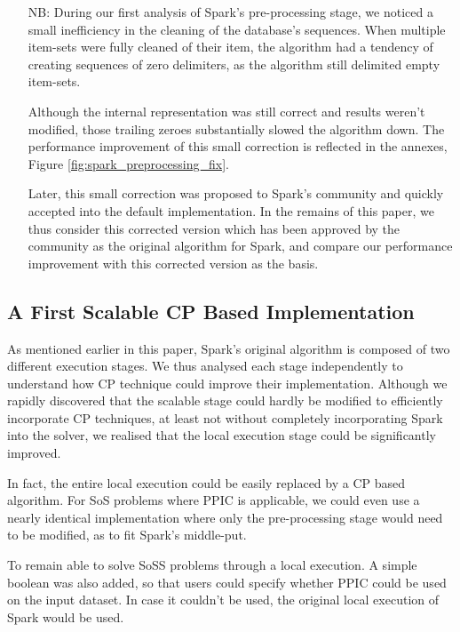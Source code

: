 \documentclass{eplmastersthesis}
\begin{document}
\begin{itemize}
  \item[NB:] During our first analysis of Spark's pre-processing stage, we noticed a small inefficiency in the cleaning of the database's sequences. When multiple item-sets were fully cleaned of their item, the algorithm had a tendency of creating sequences of zero delimiters, as the algorithm still delimited empty item-sets.

Although the internal representation was still correct and results weren't modified, those trailing zeroes substantially slowed the algorithm down.
The performance improvement of this small correction is reflected in the annexes, Figure \ref{fig:spark_preprocessing_fix}.

Later, this small correction was proposed to Spark's community and quickly accepted into the default implementation. In the remains of this paper, we thus consider this corrected version which has been approved by the community as the original algorithm for Spark, and compare our performance improvement with this corrected version as the basis.
\end{itemize}

\subsection{A First Scalable CP Based Implementation}

As mentioned earlier in this paper, Spark's original algorithm is composed of two different execution stages. We thus analysed each stage independently to understand how CP technique could improve their implementation. Although we rapidly discovered that the scalable stage could hardly be modified to efficiently incorporate CP techniques, at least not without completely incorporating Spark into the solver, we realised that the local execution stage could be significantly improved. \newline

In fact, the entire local execution could be easily replaced by a CP based algorithm. For \acrshort{SoS} problems where PPIC is applicable, we could even use a nearly identical implementation where only the pre-processing stage would need to be modified, as to fit Spark's middle-put. \newline

To remain able to solve \acrshort{SoSS} problems through a local execution. A simple boolean was also added, so that users could specify whether PPIC could be used on the input dataset. In case it couldn't be used, the original local execution of Spark would be used. \newline
\end{document}
